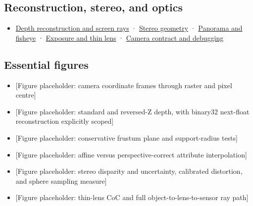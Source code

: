 \subsection{Reconstruction, stereo, and optics}\label{appendix-a2b71a18f5a2-reconstruction-stereo-and-optics}

\hypertarget{appendix-a2b71a18f5a2-reconstruction-stereo-and-optics}{}

\begin{itemize}
\tightlist
\item
  \hyperref[02-foundations-ii-ch035-recover-geometry-from-depth-and-construct-screen-space-rays]{Depth reconstruction and screen rays} · \hyperref[02-foundations-ii-ch035-build-projection-and-stereo-geometry-around-real-camera-baselines]{Stereo geometry} · \hyperref[02-foundations-ii-ch035-represent-directions-over-the-full-sphere]{Panorama and fisheye} · \hyperref[02-foundations-ii-ch036-model-exposure-physical-optics-and-depth-of-field]{Exposure and thin lens} · \hyperref[02-foundations-ii-ch037-make-camera-conventions-explicit-and-debug-the-full-transform-chain]{Camera contract and debugging}
\end{itemize}

\subsection{Essential figures}\label{appendix-a2b71a18f5a2-essential-figures}

\hypertarget{appendix-a2b71a18f5a2-essential-figures}{}

\begin{itemize}
\tightlist
\item
  {[}Figure placeholder: camera coordinate frames through raster and pixel centre{]}
\item
  {[}Figure placeholder: standard and reversed-Z depth, with binary32 next-float reconstruction explicitly scoped{]}
\item
  {[}Figure placeholder: conservative frustum plane and support-radius tests{]}
\item
  {[}Figure placeholder: affine versus perspective-correct attribute interpolation{]}
\item
  {[}Figure placeholder: stereo disparity and uncertainty, calibrated distortion, and sphere sampling measure{]}
\item
  {[}Figure placeholder: thin-lens CoC and full object-to-lens-to-sensor ray path{]}
\end{itemize}

